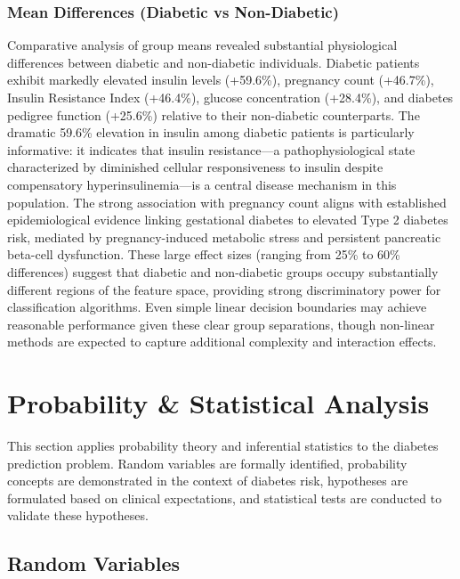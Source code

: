 \documentclass[12pt]{article}
\begin{document}
\subsubsection{Mean Differences (Diabetic vs Non-Diabetic)}

Comparative analysis of group means revealed substantial physiological differences between diabetic and non-diabetic individuals. Diabetic patients exhibit markedly elevated insulin levels (+59.6\%), pregnancy count (+46.7\%), Insulin Resistance Index (+46.4\%), glucose concentration (+28.4\%), and diabetes pedigree function (+25.6\%) relative to their non-diabetic counterparts. The dramatic 59.6\% elevation in insulin among diabetic patients is particularly informative: it indicates that insulin resistance—a pathophysiological state characterized by diminished cellular responsiveness to insulin despite compensatory hyperinsulinemia—is a central disease mechanism in this population. The strong association with pregnancy count aligns with established epidemiological evidence linking gestational diabetes to elevated Type 2 diabetes risk, mediated by pregnancy-induced metabolic stress and persistent pancreatic beta-cell dysfunction. These large effect sizes (ranging from 25\% to 60\% differences) suggest that diabetic and non-diabetic groups occupy substantially different regions of the feature space, providing strong discriminatory power for classification algorithms. Even simple linear decision boundaries may achieve reasonable performance given these clear group separations, though non-linear methods are expected to capture additional complexity and interaction effects.


\section{Probability \& Statistical Analysis}

This section applies probability theory and inferential statistics to the diabetes prediction problem. Random variables are formally identified, probability concepts are demonstrated in the context of diabetes risk, hypotheses are formulated based on clinical expectations, and statistical tests are conducted to validate these hypotheses.

\subsection{Random Variables}
\end{document}
